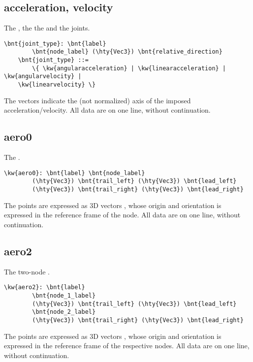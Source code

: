 \subsection{acceleration, velocity}
The , the  
the  and the  joints.
\begin{Verbatim}[commandchars=\\\{\}]
    \bnt{joint_type}: \bnt{label}
        \bnt{node_label} (\hty{Vec3}) \bnt{relative_direction}
    \bnt{joint_type} ::=
    	\{ \kw{angularacceleration} | \kw{linearacceleration} | \kw{angularvelocity} |
	\kw{linearvelocity} \}
\end{Verbatim}
The  vectors indicate the (not normalized) axis of the imposed
acceleration/velocity.
All data are on one line, without continuation.

\subsection{aero0}
The .
\begin{Verbatim}[commandchars=\\\{\}]
    \kw{aero0}: \bnt{label} \bnt{node_label}
        (\hty{Vec3}) \bnt{trail_left} (\hty{Vec3}) \bnt{lead_left}
        (\hty{Vec3}) \bnt{trail_right} (\hty{Vec3}) \bnt{lead_right}
\end{Verbatim}
The points are expressed as 3D vectors , whose origin and orientation
is expressed in the reference frame of the node.
All data are on one line, without continuation.

\subsection{aero2}
The two-node .
\begin{Verbatim}[commandchars=\\\{\}]
    \kw{aero2}: \bnt{label}
        \bnt{node_1_label}
        (\hty{Vec3}) \bnt{trail_left} (\hty{Vec3}) \bnt{lead_left}
        \bnt{node_2_label}
        (\hty{Vec3}) \bnt{trail_right} (\hty{Vec3}) \bnt{lead_right}
\end{Verbatim}
The points are expressed as 3D vectors , whose origin and orientation
is expressed in the reference frame of the respective nodes.
All data are on one line, without continuation.

